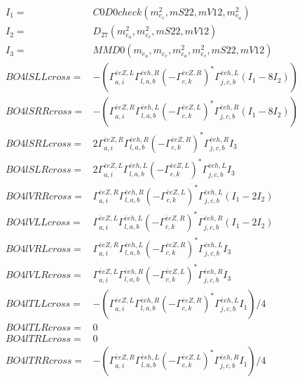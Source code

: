 \documentclass[A4,landscape]{article}
\begin{document}
\begin{align} 
I_1 = & C0D0check(m^2_{e_{{c}}}, mS22, mV12, m^2_{e_{{a}}}) \\ 
I_2 = & D_{27}(m^2_{e_{{a}}}, m^2_{e_{{c}}}, mS22, mV12) \\ 
I_3 = & MMD0(m_{e_{{a}}}, m_{e_{{c}}}, m^2_{e_{{a}}}, m^2_{e_{{c}}}, mS22, mV12) \\ 
  BO4lSLLcross= & -( \Gamma^{\bar{e}e Z ,L}_{a, i} \Gamma^{\bar{e}e h ,R}_{l, a, b} (- \Gamma^{\bar{e}e Z ,R} _{c, k})^* \Gamma^{\bar{e}e h ,L}_{j, c, b} (I_1 - 8 I_2)) \\ 
  BO4lSRRcross= & -( \Gamma^{\bar{e}e Z ,R}_{a, i} \Gamma^{\bar{e}e h ,L}_{l, a, b} (- \Gamma^{\bar{e}e Z ,L} _{c, k})^* \Gamma^{\bar{e}e h ,R}_{j, c, b} (I_1 - 8 I_2)) \\ 
  BO4lSRLcross= & 2  \Gamma^{\bar{e}e Z ,R}_{a, i} \Gamma^{\bar{e}e h ,R}_{l, a, b} (- \Gamma^{\bar{e}e Z ,R} _{c, k})^* \Gamma^{\bar{e}e h ,R}_{j, c, b} I_3 \\ 
  BO4lSLRcross= & 2  \Gamma^{\bar{e}e Z ,L}_{a, i} \Gamma^{\bar{e}e h ,L}_{l, a, b} (- \Gamma^{\bar{e}e Z ,L} _{c, k})^* \Gamma^{\bar{e}e h ,L}_{j, c, b} I_3 \\ 
  BO4lVRRcross= &  \Gamma^{\bar{e}e Z ,R}_{a, i} \Gamma^{\bar{e}e h ,R}_{l, a, b} (- \Gamma^{\bar{e}e Z ,L} _{c, k})^* \Gamma^{\bar{e}e h ,L}_{j, c, b} (I_1 - 2 I_2) \\ 
  BO4lVLLcross= &  \Gamma^{\bar{e}e Z ,L}_{a, i} \Gamma^{\bar{e}e h ,L}_{l, a, b} (- \Gamma^{\bar{e}e Z ,R} _{c, k})^* \Gamma^{\bar{e}e h ,R}_{j, c, b} (I_1 - 2 I_2) \\ 
  BO4lVRLcross= &  \Gamma^{\bar{e}e Z ,R}_{a, i} \Gamma^{\bar{e}e h ,L}_{l, a, b} (- \Gamma^{\bar{e}e Z ,R} _{c, k})^* \Gamma^{\bar{e}e h ,L}_{j, c, b} I_3 \\ 
  BO4lVLRcross= &  \Gamma^{\bar{e}e Z ,L}_{a, i} \Gamma^{\bar{e}e h ,R}_{l, a, b} (- \Gamma^{\bar{e}e Z ,L} _{c, k})^* \Gamma^{\bar{e}e h ,R}_{j, c, b} I_3 \\ 
  BO4lTLLcross= & -( \Gamma^{\bar{e}e Z ,L}_{a, i} \Gamma^{\bar{e}e h ,R}_{l, a, b} (- \Gamma^{\bar{e}e Z ,R} _{c, k})^* \Gamma^{\bar{e}e h ,L}_{j, c, b} I_1)/4 \\ 
  BO4lTLRcross= & 0 \\ 
  BO4lTRLcross= & 0 \\ 
  BO4lTRRcross= & -( \Gamma^{\bar{e}e Z ,R}_{a, i} \Gamma^{\bar{e}e h ,L}_{l, a, b} (- \Gamma^{\bar{e}e Z ,L} _{c, k})^* \Gamma^{\bar{e}e h ,R}_{j, c, b} I_1)/4 \\ 
\end{align} 
\end{document}
